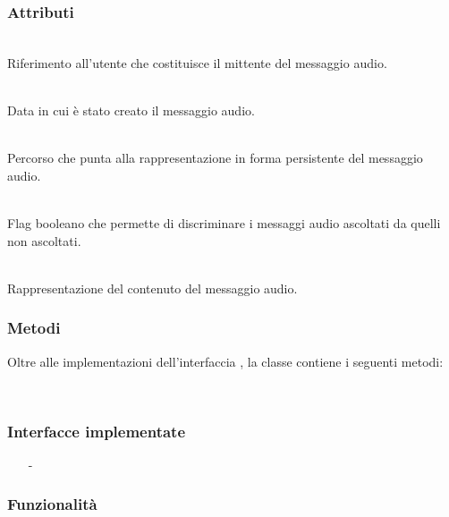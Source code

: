 \subsubsection*{Attributi}
\begin{description}
  \item{}\\
Riferimento all'utente che costituisce il mittente del messaggio audio.
  \item{}\\
Data in cui è stato creato il messaggio audio.
  \item{}\\
Percorso che punta alla rappresentazione in forma persistente del messaggio audio.
  \item{}\\
Flag booleano che permette di discriminare i messaggi audio ascoltati da quelli non ascoltati.
  \item{}\\
Rappresentazione del contenuto del messaggio audio.
\end{description}

\subsubsection*{Metodi}
Oltre alle implementazioni dell'interfaccia , la classe contiene i seguenti metodi:
\begin{description}
  \item{}\\
\end{description}


\subsubsection*{Interfacce implementate}
\begin{itemize}[noitemsep,nolistsep]
  \item[-] 
\end{itemize}

\subsubsection*{Funzionalità}

